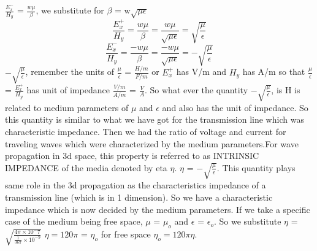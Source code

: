 $\frac{E_x^-}{H_y}$ = $\frac{w\mu}{\beta}$, we substitute for $\beta$ = w$\sqrt{\mu\epsilon}$
\begin{dmath*}
\frac{E_x^+}{H_y} = \frac{w\mu}{\beta} = \frac{w\mu}{\sqrt{\mu\epsilon}} = {\sqrt{\frac{\mu}{\epsilon}}}
\end{dmath*}
\begin{dmath*}
\frac{E_x^-}{H_y} = \frac{-w\mu}{\beta} = \frac{-w\mu}{\sqrt{\mu\epsilon}} = {-\sqrt{\frac{\mu}{\epsilon}}}
\end{dmath*}
${-\sqrt{\frac{\mu}{\epsilon}}}$, remember the units of $\frac{\mu}{\epsilon}$ = $\frac{H/m}{F/m}$ or $E_x^+$ has V/m and $H_y$ has A/m so that $\frac{\mu}{\epsilon}$ = $\frac{E_x^+}{H_y}$ has unit of impedance $\frac{V/m}{A/m}$  = $\frac{V}{A}$. So what ever the quantity ${-\sqrt{\frac{\mu}{\epsilon}}}$, is H is related to medium parameters of $\mu$ and $\epsilon$  and also has the unit of impedance. So this quantity is similar to what we have got for the transmission line which was characteristic impedance. Then we had the ratio of voltage and current for traveling waves which were characterized by the medium parameters.For wave propagation in 3d space, this property is referred to as INTRINSIC IMPEDANCE of the media denoted by eta $\eta$. $\eta$ = ${-\sqrt{\frac{\mu}{\epsilon}}}$. This quantity plays same role in the 3d propagation as the characteristics impedance of a transmission line (which is in 1 dimension). So we have a characteristic impedance which is now decided by the medium parameters. If we take  a specific case of the medium being free space, $\mu$ = $\mu_{o}$ and $\epsilon$ = $\epsilon_{o}$. So we substitute $\eta$ =$\sqrt{\frac{4\pi \times 10^-7}{\frac{1}{36\pi} \times 10^{-9}}}$ $\eta = 120\pi$ = $\eta_{o}$ for free space $\eta_{o} = 120\pi$$\eta$.

